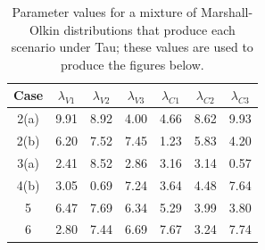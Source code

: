 \begin{table}[H]
    \centering
    \begin{tabular}{ccccccc}
         Case & $\lambda_{V1}$& $\lambda_{V2}$& $\lambda_{V3}$& $\lambda_{C1}$& $\lambda_{C2}$& $\lambda_{C3}$ \\ \hline
        2(a)    & 9.91& 8.92& 4.00& 4.66& 8.62& 9.93\\
        2(b)    & 6.20& 7.52& 7.45& 1.23& 5.83& 4.20\\
        3(a)    & 2.41& 8.52& 2.86& 3.16& 3.14& 0.57\\
        4(b)    & 3.05& 0.69& 7.24& 3.64& 4.48& 7.64\\
        5       & 6.47& 7.69& 6.34& 5.29& 3.99& 3.80\\
        6       & 2.80& 7.44& 6.69& 7.67& 3.24& 7.74\\
    \end{tabular}
    \caption{Parameter values for a mixture of Marshall-Olkin distributions that produce each scenario under Tau; these values are used to produce the figures below.}
    \label{tab:tau}
\end{table}
\renewcommand{\arraystretch}{0.7}
